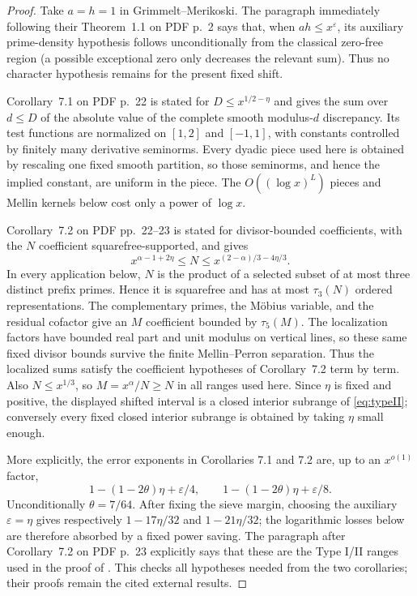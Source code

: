 \documentclass[10pt,reqno]{amsart}
\newcommand{\1}{\mathbf{1}}
\theoremstyle{plain}
\theoremstyle{remark}
\begin{document}
\begin{proof}
Take $a=h=1$ in Grimmelt--Merikoski.  The paragraph immediately following
their Theorem~1.1 on PDF p.~2 says that, when $ah\le x^\varepsilon$, its
auxiliary prime-density hypothesis follows unconditionally from the
classical zero-free region (a possible exceptional zero only decreases the
relevant sum).  Thus no character hypothesis remains for the present fixed
shift.

Corollary~7.1 on PDF p.~22 is stated for $D\le x^{1/2-\eta}$ and gives the
sum over $d\le D$ of the absolute value of the complete smooth modulus-$d$
discrepancy.  Its test functions are normalized on $[1,2]$ and $[-1,1]$,
with constants controlled by finitely many derivative seminorms.  Every
dyadic piece used here is obtained by rescaling one fixed smooth partition,
so those seminorms, and hence the implied constant, are uniform in the
piece.  The $O((\log x)^L)$ pieces and Mellin kernels below cost only a
power of $\log x$.

Corollary~7.2 on PDF pp.~22--23 is stated for divisor-bounded coefficients,
with the $N$ coefficient squarefree-supported, and gives
\[
  x^{\alpha-1+2\eta}\le N
  \le x^{(2-\alpha)/3-4\eta/3}.
\]
In every application below, $N$ is the product of a selected subset of at
most three distinct prefix primes.  Hence it is squarefree and has at most
$\tau_3(N)$ ordered representations.  The complementary primes, the
Möbius variable, and the residual cofactor give an $M$ coefficient bounded
by $\tau_5(M)$.  The localization factors have bounded real part and unit
modulus on vertical lines, so these same fixed divisor bounds survive the
finite Mellin--Perron separation.  Thus the localized sums satisfy the
coefficient hypotheses of Corollary~7.2 term by term.  Also $N\le x^{1/3}$,
so $M=x^\alpha/N\ge N$ in all ranges used here.  Since $\eta$ is fixed and
positive, the displayed shifted interval is a closed interior subrange of
\eqref{eq:typeII}; conversely every fixed closed interior subrange is
obtained by taking $\eta$ small enough.

More explicitly, the error exponents in Corollaries 7.1 and 7.2 are,
up to an $x^{o(1)}$ factor,
\[
  1-(1-2\theta)\eta+\varepsilon/4,
  \qquad
  1-(1-2\theta)\eta+\varepsilon/8.
\]
Unconditionally $\theta=7/64$.  After fixing the sieve margin, choosing the
auxiliary $\varepsilon=\eta$ gives respectively
$1-17\eta/32$ and $1-21\eta/32$; the logarithmic losses below are therefore
absorbed by a fixed power saving.  The paragraph after Corollary~7.2 on
PDF p.~23 explicitly says that these are the Type I/II ranges used in the
proof of \cite[Theorem 2]{Merikoski2020}.  This checks all hypotheses needed
from the two corollaries; their proofs remain the cited external results.
\end{proof}
\end{document}
